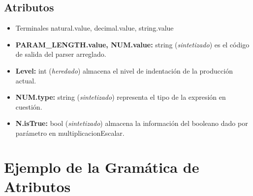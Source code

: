 \documentclass[10pt,a4paper]{article}
\begin{document}
\subsection{Atributos}

\begin{itemize}
\item Terminales natural.value, decimal.value, string.value
\item \textbf{PARAM\_LENGTH.value, NUM.value:} string (\textit{sintetizado}) es el código de salida del parser arreglado.
\item \textbf{Level:} int (\textit{heredado}) almacena el nivel de indentación de la producción actual.
\item \textbf{NUM.type:} string (\textit{sintetizado}) representa el tipo de la expresión en cuestión.
\item \textbf{N.isTrue:} bool (\textit{sintetizado}) almacena la información del booleano dado por parámetro en multiplicacionEscalar.
\end{itemize}

\section{Ejemplo de la Gramática de Atributos}
\end{document}
